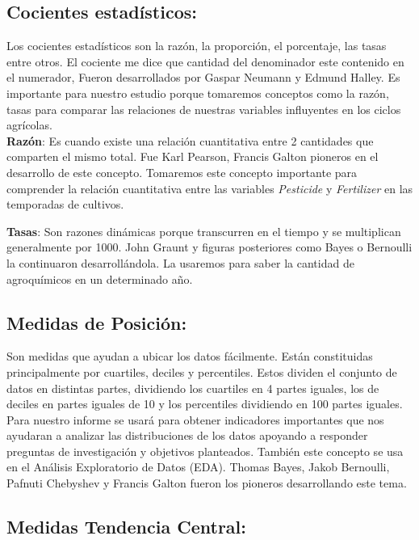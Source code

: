 \documentclass[oneside,11pt]{Latex/Classes/PhDthesisPSnPDF}
\begin{document}
\subsection{Cocientes estadísticos:}

Los cocientes estadísticos son la razón, la proporción, el porcentaje,
las tasas entre otros. El cociente me dice que cantidad del denominador
este contenido en el numerador, Fueron desarrollados por Gaspar Neumann
y Edmund Halley. Es importante para nuestro estudio porque tomaremos
conceptos como la razón, tasas para comparar las relaciones de nuestras
variables influyentes en los ciclos agrícolas.\\

\textbf{Razón}: Es cuando existe una relación cuantitativa entre 2
cantidades que comparten el mismo total. Fue Karl Pearson, Francis
Galton pioneros en el desarrollo de este concepto. Tomaremos este
concepto importante para comprender la relación cuantitativa entre las
variables \emph{Pesticide} y \emph{Fertilizer} en las temporadas de
cultivos.

\textbf{Tasas}: Son razones dinámicas porque transcurren en el tiempo y
se multiplican generalmente por 1000. John Graunt y figuras posteriores
como Bayes o Bernoulli la continuaron desarrollándola. La usaremos para
saber la cantidad de agroquímicos en un determinado año.

\subsection{Medidas de Posición:}

Son medidas que ayudan a ubicar los datos fácilmente. Están constituidas
principalmente por cuartiles, deciles y percentiles. Estos dividen el
conjunto de datos en distintas partes, dividiendo los cuartiles en 4
partes iguales, los de deciles en partes iguales de 10 y los percentiles
dividiendo en 100 partes iguales. Para nuestro informe se usará para
obtener indicadores importantes que nos ayudaran a analizar las
distribuciones de los datos apoyando a responder preguntas de
investigación y objetivos planteados. También este concepto se usa en el
Análisis Exploratorio de Datos (EDA). Thomas Bayes, Jakob Bernoulli,
Pafnuti Chebyshev y Francis Galton fueron los pioneros desarrollando
este tema.\\

\subsection{Medidas Tendencia Central:}
\end{document}

